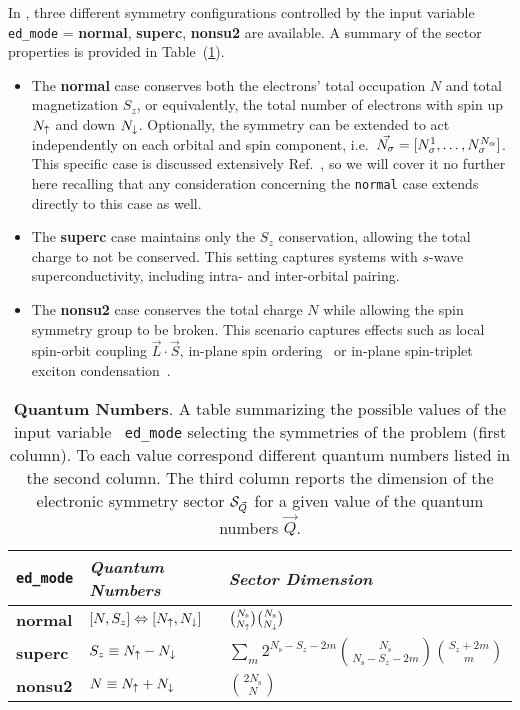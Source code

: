 \documentclass[edipack_sp.tex]{subfiles}
\begin{document}
In \NAME, three different symmetry configurations 
controlled by the input variable {\tt ed\_mode} = {\bf normal}, 
{\bf superc}, {\bf nonsu2} are available. A summary of the sector properties is provided in
Table~(\ref{TabSector}). 

\begin{itemize}
\item{} The {\bf normal} case conserves both the electrons' total occupation $N$
and total magnetization $S_z$, or equivalently, the total number
of electrons with spin up $N_\uparrow$ and down $N_\downarrow$.
Optionally, the symmetry
can be extended to act independently on each orbital and spin
component, i.e.~$\vec{N_\sigma}=[N^1_\sigma,\dots,N^{N_\alpha}_\sigma]$. This
specific case is discussed extensively
Ref.~\cite{Amaricci2022}, so we will cover it no further here recalling that any consideration concerning the {\tt normal} case extends directly to this case as well.

%

\item{} The {\bf superc} case maintains only the $S_z$ conservation,
allowing the total charge to not be conserved. This setting captures
systems with $s$-wave superconductivity, including 
intra- and inter-orbital pairing.

\item{} The {\bf nonsu2} case conserves the total
charge $N$ while allowing the spin symmetry group to be broken.
This scenario captures effects such as local spin-orbit coupling
$\vec{L}\cdot\vec{S}$, in-plane spin ordering~\cite{BellomiaKMH} or
in-plane spin-triplet exciton condensation~\cite{Amaricci2023_excitons,Blason}.  
\end{itemize}


\begin{table}%
\begin{tabularx}{\linewidth}{ |X|X|X| }
 \hline
  {\tt ed\_mode} & {\it Quantum Numbers} & {\it Sector Dimension} \\
  \hline
  {\bf normal} & $[N,S_z]\Leftrightarrow[N_\uparrow,N_\downarrow]$ &
                                                $\binom{N_\mathrm{s}}{N_\uparrow}\binom{N_\mathrm{s}}{N_\downarrow}$
  \\
  \hline
  {\bf superc} & $S_z\equiv N_\uparrow-N_\downarrow$ &  $\sum_m 2^{N_\mathrm{s}-S_z-2m}\binom{N_\mathrm{s}}{N_\mathrm{s}-S_z-2m}\binom{S_z+2m}{m}$
  \\
  \hline
  {\bf nonsu2} & $N \equiv N_\uparrow+N_\downarrow$ & $\binom{2N_\mathrm{s}}{N}$ \\ 
 \hline  
\end{tabularx}
\vspace{2mm}
\caption{\label{TabSector}
  {\bf Quantum Numbers}.
A table summarizing the possible values of the input variable {\tt
  ed\_mode} selecting the symmetries of the problem (first column). To each value
correspond different quantum numbers listed in the second column.
The third column reports the dimension of the electronic symmetry sector ${\cal S}_{\vec{Q}}$ for a
given value of the quantum numbers $\vec{Q}$.}
\end{table}
\end{document}
